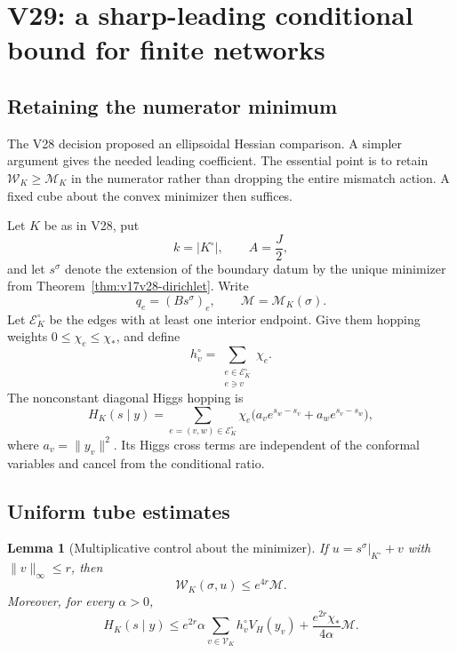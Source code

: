 \documentclass[11pt]{article}
\newtheorem{lemma}[theorem]{Lemma}
\theoremstyle{remark}
\begin{document}
\section{V29: a sharp-leading conditional bound for finite networks}
\label{sec:v17v29}

\subsection{Retaining the numerator minimum}

The V28 decision proposed an ellipsoidal Hessian comparison.  A simpler
argument gives the needed leading coefficient.  The essential point is
to retain
\(\mathcal W_K\geq\mathcal M_K\) in the numerator rather than dropping
the entire mismatch action.  A fixed cube about the convex minimizer
then suffices.

Let \(K\) be as in V28, put
\[
 k=|K^\circ|,
 \qquad A=\frac J2,                                \tag{29.1}
\]
and let \(s^\sigma\) denote the extension of the boundary datum by the
unique minimizer from Theorem~\ref{thm:v17v28-dirichlet}.  Write
\[
 q_e=(Bs^\sigma)_e,
 \qquad \mathcal M=\mathcal M_K(\sigma).           \tag{29.2}
\]
Let \(\mathcal E_K^\circ\) be the edges with at least one interior
endpoint.  Give them hopping weights \(0\leq\chi_e\leq\chi_*\), and
define
\[
 h_v^\circ=\sum_{\substack{e\in\mathcal E_K^\circ\\e\ni v}}\chi_e.
                                                               \tag{29.3}
\]
The nonconstant diagonal Higgs hopping is
\[
 H_K(s\mid y)
 =\sum_{e=(v,w)\in\mathcal E_K^\circ}\chi_e
 \bigl(a_ve^{s_w-s_v}+a_we^{s_v-s_w}\bigr),       \tag{29.4}
\]
where \(a_v=\|y_v\|^2\).  Its Higgs cross terms are independent of the
conformal variables and cancel from the conditional ratio.

\subsection{Uniform tube estimates}

\begin{lemma}[Multiplicative control about the minimizer]
\label{lem:v17v29-tube}
If \(u=s^\sigma|_{K^\circ}+v\) with
\(\|v\|_\infty\leq r\), then
\[
 \mathcal W_K(\sigma,u)
 \leq e^{4r}\mathcal M.                           \tag{29.5}
\]
Moreover, for every \(\alpha>0\),
\[
 H_K(s\mid y)
 \leq e^{2r}\alpha\sum_{v\in\mathcal V_K}
 h_v^\circ V_H(y_v)
 +\frac{e^{2r}\chi_*}{4\alpha}\mathcal M.         \tag{29.6}
\]
\end{lemma}
\end{document}
